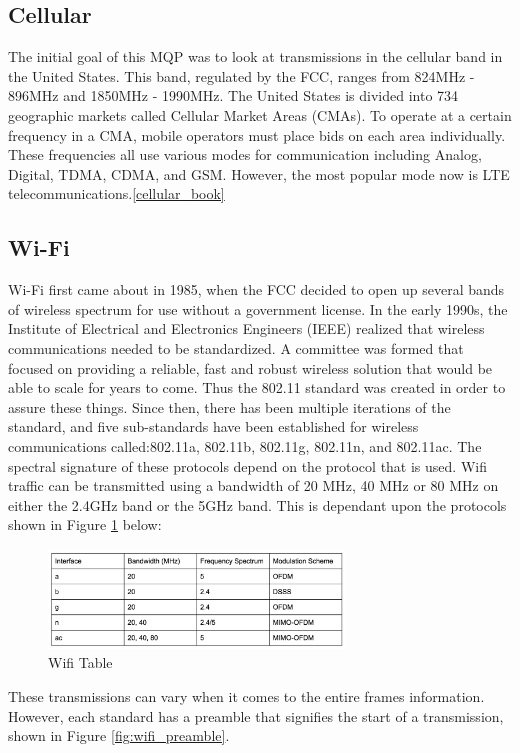 \subsection{Cellular}
The initial goal of this MQP was to look at transmissions in the cellular band in the United States. This band, regulated by the FCC, ranges from 824MHz - 896MHz and 1850MHz - 1990MHz. The United States is divided into 734 geographic markets called Cellular Market Areas (CMAs). To operate at a certain frequency in a CMA, mobile operators must place bids on each area individually. These frequencies all use various modes for communication including Analog, Digital, TDMA, CDMA, and GSM. However, the most popular mode now is LTE telecommunications.\ref{cellular_book}

\subsection{Wi-Fi}
Wi-Fi first came about in 1985, when the FCC decided to open up several bands of wireless spectrum for use without a government license. In the early 1990s, the Institute of Electrical and Electronics Engineers (IEEE) realized that wireless communications needed to be standardized. A committee was formed that focused on providing a reliable, fast and robust wireless solution that would be able to scale for years to come. Thus the 802.11 standard was created in order to assure these things. Since then, there has been multiple iterations of the standard, and five sub-standards have been established for wireless communications called:802.11a, 802.11b, 802.11g, 802.11n, and 802.11ac. The spectral signature of these protocols depend on the protocol that is used. Wifi traffic can be transmitted using a bandwidth of 20 MHz, 40 MHz or 80 MHz on either the 2.4GHz band or the 5GHz band. This is dependant upon the protocols shown in Figure \ref{fig:wifi_table} below:
\begin{figure}[ht]
\centering
\includegraphics[width=0.70\textwidth]{img/wifi_table.png}
\caption{Wifi Table}
\label{fig:wifi_table}
\end{figure}\par
These transmissions can vary when it comes to the entire frames information. However, each standard has a preamble that signifies the start of a transmission, shown in Figure \ref{fig:wifi_preamble}.
